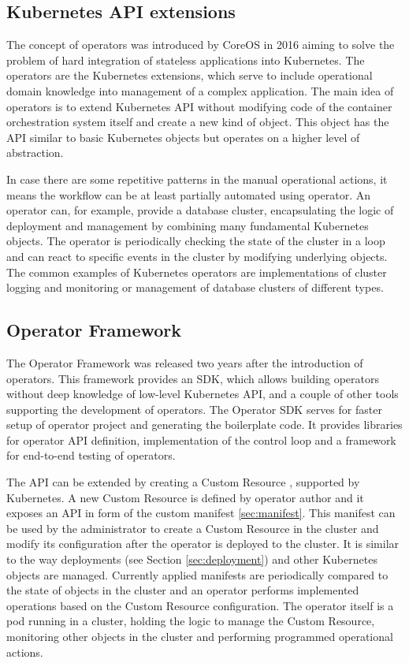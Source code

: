 \documentclass[
  digital, %
  twoside, %
  table,   %
  lof,     %
  lot,     %
]{fithesis3}
\begin{document}
\subsection{Kubernetes API extensions}
The concept of operators \cite{kubernetes-operator} was introduced by CoreOS \cite{operators} in 2016 aiming to solve the problem of hard integration of stateless applications into Kubernetes. The operators are the Kubernetes extensions, which serve to include operational domain knowledge into management of a complex application. The main idea of operators is to extend Kubernetes API without modifying code of the container orchestration system itself and create a new kind of object. This object has the API similar to basic Kubernetes objects but operates on a higher level of abstraction.

In case there are some repetitive patterns in the manual operational actions, it means the workflow can be at least partially automated using operator. An operator can, for example, provide a database cluster, encapsulating the logic of deployment and management by combining many fundamental Kubernetes objects. The operator is periodically checking the state of the cluster in a loop and can react to specific events in the cluster by modifying underlying objects. The common examples of Kubernetes operators are implementations of cluster logging and monitoring or management of database clusters of different types.

\subsection{Operator Framework} \label{sec:operator_framework}
The Operator Framework \cite{operator-framework} was released two years after the introduction of operators. This framework provides an SDK, which allows building operators without deep knowledge of low-level Kubernetes API, and a couple of other tools supporting the development of operators. The Operator SDK serves for faster setup of operator project and generating the boilerplate code. It provides libraries for operator API definition, implementation of the control loop and a framework for end-to-end testing of operators.

The API can be extended by creating a Custom Resource \cite{custom-resources}, supported by Kubernetes. A new Custom Resource is defined by operator author and it exposes an API in form of the custom manifest \ref{sec:manifest}. This manifest can be used by the administrator to create a Custom Resource in the cluster and modify its configuration after the operator is deployed to the cluster. It is similar to the way deployments (see Section \ref{sec:deployment}) and other Kubernetes objects are managed. Currently applied manifests are periodically compared to the state of objects in the cluster and an operator performs implemented operations based on the Custom Resource configuration. The operator itself is a pod running in a cluster, holding the logic to manage the Custom Resource, monitoring other objects in the cluster and performing programmed operational actions.
\end{document}

